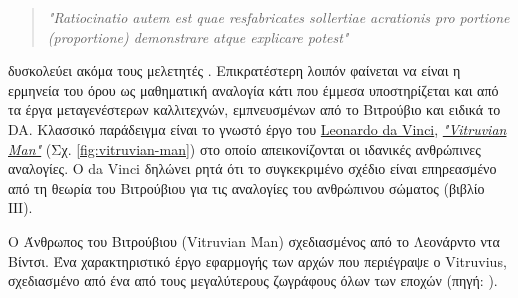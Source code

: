 \begin{description}[style=nextline]
\begin{quote}
\itshape
"Ratiocinatio autem est quae resfabricates sollertiae acrationis pro portione (proportione) demonstrare atque explicare potest"
\end{quote}

δυσκολεύει ακόμα τους μελετητές \cite{graham-education}. Επικρατέστερη λοιπόν φαίνεται να είναι η ερμηνεία του όρου ως μαθηματική αναλογία κάτι που έμμεσα υποστηρίζεται και από τα έργα μεταγενέστερων καλλιτεχνών, εμπνευσμένων από το  Βιτρούβιο και ειδικά το DA. Κλασσικό παράδειγμα είναι το γνωστό έργο του \href{https://en.wikipedia.org/wiki/Leonardo_da_Vinci}{Leonardo da Vinci}, \href{https://en.wikipedia.org/wiki/Vitruvian_Man}{\emph{"Vitruvian Man"}} (Σχ. \ref{fig:vitruvian-man}) στο οποίο απεικονίζονται οι ιδανικές ανθρώπινες αναλογίες. Ο da Vinci δηλώνει ρητά ότι το συγκεκριμένο σχέδιο είναι επηρεασμένο από τη θεωρία του Βιτρούβιου για τις αναλογίες του ανθρώπινου σώματος (βιβλίο ΙΙΙ).
\end{description}


\begin{marginfigure}%
  \caption{\footnotesize Ο  Άνθρωπος του Βιτρούβιου (Vitruvian Man) σχεδιασμένος
  από το Λεονάρντο ντα Βίντσι. Ένα χαρακτηριστικό έργο εφαρμογής των αρχών που 
  περιέγραψε ο Vitruvius, σχεδιασμένο από ένα από τους μεγαλύτερους ζωγράφους 
  όλων των εποχών
  (πηγή: \cite{wikipedia:vitruvianman}).}
  \label{fig:vitruvian-man}
\end{marginfigure}